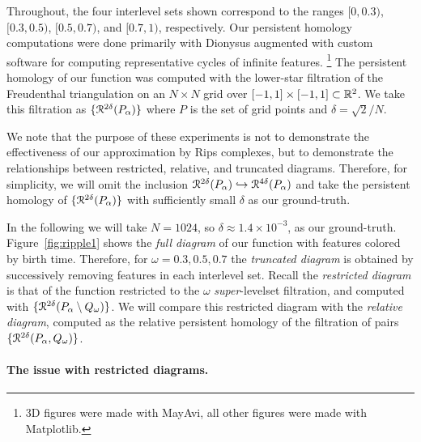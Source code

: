 Throughout, the four interlevel sets shown correspond to the ranges $[0, 0.3)$, $[0.3, 0.5)$, $[0.5, 0.7)$, and $[0.7, 1)$, respectively.
Our persistent homology computations were done primarily with Dionysus augmented with custom software for computing representative cycles of infinite features.
\footnote{3D figures were made with MayAvi, all other figures were made with Matplotlib.}
The persistent homology of our function was computed with the lower-star filtration of the Freudenthal triangulation on an $N\times N$ grid over $[-1,1]\times[-1,1]\subset\mathbb{R}^2$.
We take this filtration as $\{\mathcal{R}^{2\delta}(P_\alpha)\}$ where $P$ is the set of grid points and $\delta = \sqrt{2} / N$.

We note that the purpose of these experiments is not to demonstrate the effectiveness of our approximation by Rips complexes, but to demonstrate the relationships between restricted, relative, and truncated diagrams.
Therefore, for simplicity, we will omit the inclusion $\mathcal{R}^{2\delta}(P_\alpha)\hookrightarrow\mathcal{R}^{4\delta}(P_\alpha)$ and take the persistent homology of $\{\mathcal{R}^{2\delta}(P_\alpha)\}$ with sufficiently small $\delta$ as our ground-truth.

In the following we will take $N = 1024$, so $\delta\approx 1.4\times 10^{-3}$, as our ground-truth.
Figure~\ref{fig:ripple1} shows the \emph{full diagram} of our function with features colored by birth time.
Therefore, for $\omega = 0.3, 0.5, 0.7$ the \emph{truncated diagram} is obtained by successively removing features in each interlevel set.
Recall the \emph{restricted diagram} is that of the function restricted to the $\omega$ \emph{super}-levelset filtration, and computed with $\{\mathcal{R}^{2\delta}(P_\alpha\setminus Q_\omega)\}$.
We will compare this restricted diagram with the \emph{relative diagram}, computed as the relative persistent homology of the filtration of pairs $\{\mathcal{R}^{2\delta}(P_\alpha, Q_\omega)\}$.

\paragraph*{The issue with restricted diagrams.}


